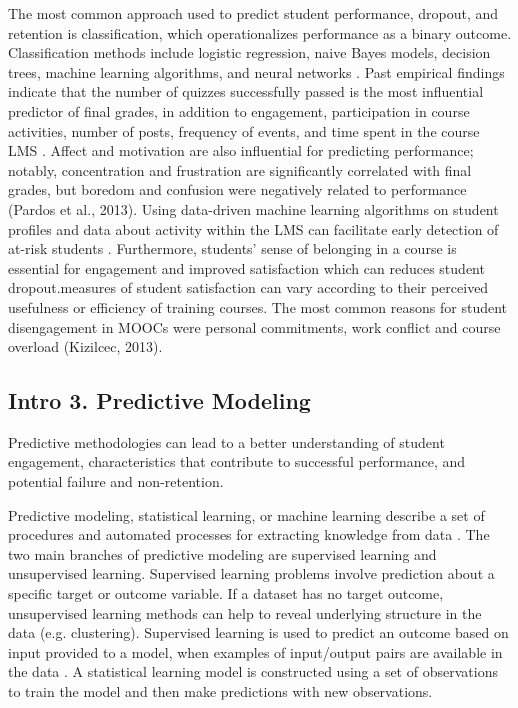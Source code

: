 \documentclass[sigconf]{acmart}
\begin{document}
The most common approach used to predict student performance, dropout, and 
retention is classification, which operationalizes performance as a binary 
outcome. Classification methods include logistic regression, naive Bayes 
models, decision trees, machine learning algorithms, and neural networks 
\cite{Lykourentzou09}. Past empirical findings indicate that the number of 
quizzes successfully passed is the most influential predictor of final grades, 
in addition to engagement, participation in course activities, number of posts, 
frequency of events, and time spent in the course LMS 
\cite{Papamitsiou14, romerozaldivar12}. Affect and motivation are also 
influential for predicting performance; notably, concentration and 
frustration are significantly correlated with final grades, but boredom and 
confusion were negatively related to performance (Pardos et al., 2013). 
Using data-driven machine learning algorithms on student profiles and data 
about activity within the LMS can facilitate early detection of at-risk 
students \cite{Dekkar09}. Furthermore, students’ sense of belonging in a 
course is essential for engagement and improved satisfaction which can 
reduces student dropout.measures of student satisfaction can vary according 
to their perceived usefulness or efficiency of training courses. The most 
common reasons for  student disengagement in MOOCs were personal commitments, 
work conflict and course overload (Kizilcec, 2013). 


\subsection{Intro 3. Predictive Modeling}

Predictive methodologies can lead to a better understanding of student 
engagement, characteristics that contribute to successful performance, and 
potential failure and non-retention. 

Predictive modeling, statistical learning, or machine learning describe a 
set of procedures and automated processes for extracting knowledge from 
data \cite{james13, kuhn13, muller17, raschka17}. The two main branches 
of predictive modeling are supervised learning and unsupervised learning. 
Supervised learning problems involve prediction about a specific target 
or outcome variable. If a dataset has no target outcome, unsupervised 
learning methods can help to reveal underlying structure in the data 
(e.g. clustering). Supervised learning is used to predict an outcome based 
on input provided to a model, when examples of input/output pairs are 
available in the data \cite{muller17}. A statistical learning model is 
constructed using a set of observations to train the model and then make
predictions with new observations.
\end{document}
